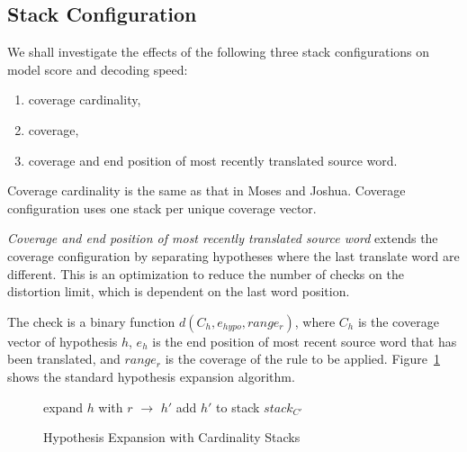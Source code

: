 \documentclass[11pt]{article}
\begin{document}

\subsection{Stack Configuration}

We shall investigate the effects of the following three stack configurations on model score and decoding speed:
\begin{enumerate}
  \item \vspace{-2 mm} coverage cardinality,
  \item \vspace{-2 mm} coverage,
  \item \vspace{-2 mm} coverage and end position of most recently translated source word.
\end{enumerate}
Coverage cardinality is the same as that in Moses and Joshua. Coverage configuration uses one stack per unique coverage vector.

\emph{Coverage and end position of most recently translated source word} extends the coverage configuration by separating hypotheses where the last translate word are different. This is an optimization to reduce the number of checks on the distortion limit, which is dependent on the last word position. 

The check is a binary function $d(C_{h}, e_{hypo}, range_r)$, where $C_{h}$ is the coverage vector of hypothesis $h$, $e_{h}$ is the end position of most recent source word that has been translated, and $range_r$ is the coverage of the rule to be applied. Figure~\ref{algo:Hypothesis Expansion with Unsorted Stack} shows the standard hypothesis expansion algorithm.
\begin{figure} [h]
\begin{algorithmic}
	\STATE expand $h$ with $r$ $\rightarrow$ $h'$
	\STATE add $h'$ to stack $stack_{C'}$
      \ENDIF
  \ENDFOR %
\ENDFOR %
\end{algorithmic}
\caption{Hypothesis Expansion with Cardinality Stacks}
\label{algo:Hypothesis Expansion with Unsorted Stack}
\end{figure}
\end{document}
